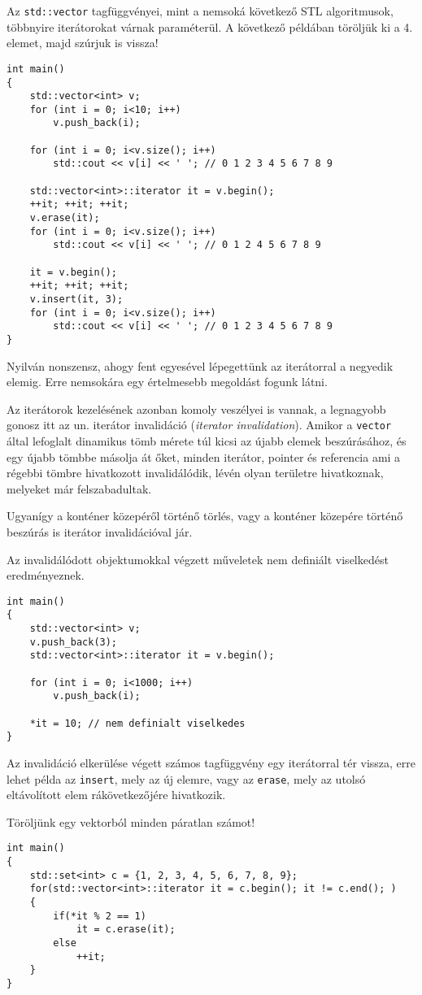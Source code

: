 \documentclass[a4paper,11.5pt,table]{article}
\begin{document}
	\medskip
	Az \texttt{std::vector} tagfüggvényei, mint a nemsoká következő STL algoritmusok, többnyire iterátorokat várnak paraméterül. A következő példában töröljük ki a 4. elemet, majd szúrjuk is vissza!
	\begin{lstlisting}
int main()
{
	std::vector<int> v;
	for (int i = 0; i<10; i++)
		v.push_back(i);
		
	for (int i = 0; i<v.size(); i++)
		std::cout << v[i] << ' '; // 0 1 2 3 4 5 6 7 8 9
		
	std::vector<int>::iterator it = v.begin();
	++it; ++it; ++it;
	v.erase(it);
	for (int i = 0; i<v.size(); i++)
		std::cout << v[i] << ' '; // 0 1 2 4 5 6 7 8 9
	
	it = v.begin();
	++it; ++it; ++it; 
	v.insert(it, 3);
	for (int i = 0; i<v.size(); i++)
		std::cout << v[i] << ' '; // 0 1 2 3 4 5 6 7 8 9
}
	\end{lstlisting}
	\begin{note}
		Nyilván nonszensz, ahogy fent egyesével lépegettünk az iterátorral a negyedik elemig. Erre nemsokára egy értelmesebb megoldást fogunk látni.
	\end{note}
	Az iterátorok kezelésének azonban komoly veszélyei is vannak, a legnagyobb gonosz itt az un. iterátor invalidáció (\textit{iterator invalidation}). Amikor a \texttt{vector} által lefoglalt dinamikus tömb mérete túl kicsi az újabb elemek beszúrásához, és egy újabb tömbbe másolja át őket, minden iterátor, pointer és referencia ami a régebbi tömbre hivatkozott invalidálódik, lévén olyan területre hivatkoznak, melyeket már felszabadultak. 
	\smallskip
	
	Ugyanígy a konténer közepéről történő törlés, vagy a konténer közepére történő beszúrás is iterátor invalidációval jár.
	\smallskip
	
	Az invalidálódott objektumokkal végzett műveletek nem definiált viselkedést eredményeznek.
	\begin{lstlisting}
int main()
{
	std::vector<int> v;
	v.push_back(3);
	std::vector<int>::iterator it = v.begin();
	
	for (int i = 0; i<1000; i++)
		v.push_back(i);
		
	*it = 10; // nem definialt viselkedes
}
	\end{lstlisting}
	Az invalidáció elkerülése végett számos tagfüggvény egy iterátorral tér vissza, erre lehet példa az \texttt{insert}, mely az új elemre, vagy az \texttt{erase}, mely az utolsó eltávolított elem rákövetkezőjére hivatkozik.
	
	\smallskip
	Töröljünk egy vektorból minden páratlan számot!
	\begin{lstlisting}
int main()
{
	std::set<int> c = {1, 2, 3, 4, 5, 6, 7, 8, 9};
	for(std::vector<int>::iterator it = c.begin(); it != c.end(); )
	{
		if(*it % 2 == 1)
			it = c.erase(it);
		else
			++it;
	}
}
	\end{lstlisting}
	
\end{document}
